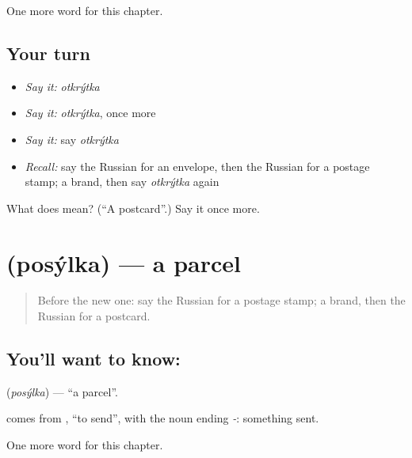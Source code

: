 \begin{grammarlens}[title={What you've built}]
One more word for this chapter.
\end{grammarlens}

\subsection*{Your turn}
\begin{itemize}
\raggedright
  \item \emph{Say it:} \emph{otkrýtka}
  \item \emph{Say it:} \emph{otkrýtka}, once more
  \item \emph{Say it:} say \emph{otkrýtka}
  \item \emph{Recall:} say the Russian for an envelope, then the Russian for a postage stamp; a brand, then say \emph{otkrýtka} again
\end{itemize}

\begin{tcolorbox}[breakable,colback=teal!4,colframe=teal!35!black,title={Before you move on}]
What does  mean? (\textquotedblleft{}A postcard\textquotedblright{}.) Say it once more.
\end{tcolorbox}
\section[\texorpdfstring{\ru{посылка} (posýlka)}{посылка (posýlka)}]{ (posýlka) — a parcel}

\label{lesson:RU-C161-posylka}



\begin{quote}
Before the new one: say the Russian for a postage stamp; a brand, then the Russian for a postcard.
\end{quote}

\subsection*{You'll want to know: }
\textbf{} (\emph{posýlka}) — \textquotedblleft{}a parcel\textquotedblright{}.

\begin{cousinweb}
\textbf{} comes from \emph{}, \textquotedblleft{}to send\textquotedblright{}, with the noun ending \emph{-}: something sent.
\end{cousinweb}

\begin{grammarlens}[title={What you've built}]
One more word for this chapter.
\end{grammarlens}


